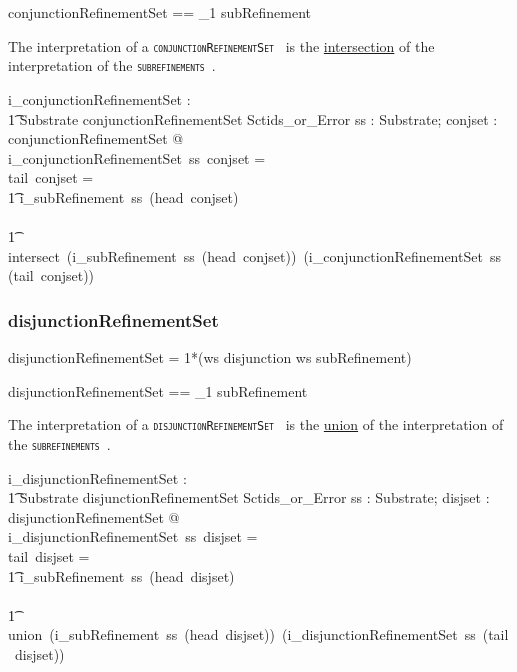 \documentclass{article}
\def\spec#1{{\tt \small \textsc{{#1}} }}
\def\bnf#1{{\scriptsize {{#1}} }}
\begin{document}
\begin{zed}
conjunctionRefinementSet == \seq_1 subRefinement 
\end{zed}

The interpretation of a \spec{conjunctionRefinementSet} is the \underline{intersection} of the interpretation of the \spec{subrefinements}.

\begin{gendef}
    i\_conjunctionRefinementSet : \\
\t1 Substrate \fun conjunctionRefinementSet \fun Sctids\_or\_Error
\where
   \forall ss : Substrate;  conjset : conjunctionRefinementSet @ \\
   i\_conjunctionRefinementSet~ss~conjset = ~ \\
   \IF tail~conjset = \langle \rangle \THEN \\
   \t1 i\_subRefinement~ss~(head~conjset) \\
\ELSE \\
\t1 intersect~(i\_subRefinement~ss~(head~conjset))~(i\_conjunctionRefinementSet~ss~(tail~conjset))
\end{gendef}

\subsubsection{disjunctionRefinementSet}
\begin{framed}
\noindent
\bnf{disjunctionRefinementSet = 1*(ws disjunction ws subRefinement)}
\end{framed}

\begin{zed}
disjunctionRefinementSet == \seq_1 subRefinement 
\end{zed}

The interpretation of a \spec{disjunctionRefinementSet} is the \underline{union} of the interpretation of the \spec{subrefinements}.

\begin{gendef}
    i\_disjunctionRefinementSet : \\
\t1 Substrate \fun disjunctionRefinementSet \fun Sctids\_or\_Error
\where
   \forall ss : Substrate;  disjset : disjunctionRefinementSet @ \\
   i\_disjunctionRefinementSet~ss~disjset = ~ \\
   \IF tail~disjset =  \langle \rangle \THEN \\
   \t1 i\_subRefinement~ss~(head~disjset) \\
\ELSE \\
\t1 union~(i\_subRefinement~ss~(head~disjset))~(i\_disjunctionRefinementSet~ss~(tail~disjset))
\end{gendef}
\end{document}
